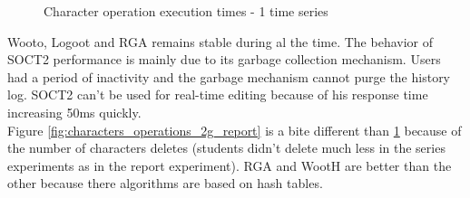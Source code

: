 \begin{figure}[h]
\begin{minipage}{.50\linewidth}
  \caption{Character operation execution times - 1 time
series}
  \label{fig:characters_operations_1t_big}
\end{minipage} \hfill
\end{figure}

Wooto, Logoot and RGA remains stable during al the time. The behavior of SOCT2 performance is mainly due to its garbage collection mechanism. Users had a period of inactivity and the garbage mechanism cannot purge the history log. SOCT2 can't be used for real-time editing because of his response time increasing 50ms quickly.\\

Figure \ref{fig:characters_operations_2g_report} is a bite different than \ref{fig:characters_operations_1t_big} because of the number of characters deletes (students didn't delete much less in the series experiments as in the report experiment). RGA and WootH are better than the other because there algorithms are based on hash tables.\\

